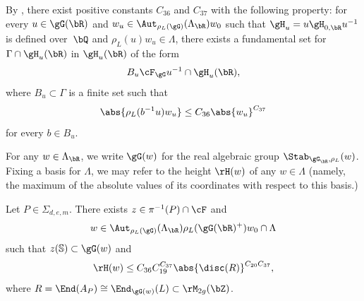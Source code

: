 By \cite[Th.\,1.2]{QRTUI}, there exist positive constants $C_{36}$ and $C_{37}$ with the following property: for every $u\in\gG(\bR)$ and $w_u\in \Aut_{\rho_L(\gG)}(\Lambda_\bR) w_0$ such that $\gH_u = u \gH_{0,\bR} u^{-1}$ is defined over~$\bQ$ and $\rho_L(u) w_u \in \Lambda$, there exists a fundamental set for $\Gamma\cap\gH_u(\bR)$ in $\gH_u(\bR)$ of the form
\[
B_u\cF_\gG u^{-1}\cap\gH_u(\bR),\]
where $B_u\subset\Gamma$ is a finite set such that
\[\abs{\rho_L(b^{-1}u)w_u} \leq C_{36} \abs{w_u}^{C_{37}}\]
for every $b\in B_u$.

For any $w\in\Lambda_\bR$, we write $\gG(w)$ for the real algebraic group $\Stab_{\gG_\bR,\rho_L}(w)$. Fixing a basis for $\Lambda$, we may refer to the height $\rH(w)$ of any $w\in\Lambda$ (namely, the maximum of the absolute values of its coordinates with respect to this basis.)

\begin{lemma} \label{z-w}
Let $P\in\Sigma_{d,e,m}$. There exists $z\in \pi^{-1}(P)\cap\cF$ and
\[w\in \Aut_{\rho_L(\gG)}(\Lambda_\bR)\rho_L(\gG(\bR)^+)w_0\cap\Lambda\]
such that $z(\mathbb{S})\subset\gG(w)$ and
\[\rH(w)\leq C_{36}C_{19}^{C_{37}} \abs{\disc(R)}^{C_{20}C_{37}},\]
where $R=\End(A_P)\cong\End_{\gG(w)}(L)\subset \rM_{2g}(\bZ)$.
\end{lemma}

